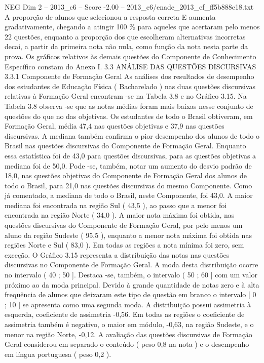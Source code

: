 \begin{textsample}{NEG Dim 2 – 2013\_c6 – Score -2.00 – 2013\_c6/enade\_2013\_ef\_ff5b888e18.txt}
A proporção de alunos que selecionou a resposta correta E aumenta gradativamente, chegando a atingir 100 \% para aqueles que acertaram pelo menos 22 questões, enquanto a proporção dos que escolheram alternativas incorretas decai, a partir da primeira nota não nula, como função da nota nesta parte da prova.
Os gráficos relativos às demais questões do Componente de Conhecimento Específico constam do Anexo I. 3.3 ANÁLISE DAS QUESTÕES DISCURSIVAS 3.3.1 Componente de Formação Geral As análises dos resultados de desempenho dos estudantes de Educação Física ( Bacharelado ) nas duas questões discursivas relativas à Formação Geral encontram -se na Tabela 3.8 e no Gráfico 3.15.
Na Tabela 3.8 observa -se que as notas médias foram mais baixas nesse conjunto de questões do que no das objetivas.
Os estudantes de todo o Brasil obtiveram, em Formação Geral, média 47,4 nas questões objetivas e 37,9 nas questões discursivas.
A mediana também confirma o pior desempenho dos alunos de todo o Brasil nas questões discursivas do Componente de Formação Geral.
Enquanto essa estatística foi de 43,0 para questões discursivas, para as questões objetivas a mediana foi de 50,0.
Pode -se, também, notar um aumento do desvio padrão de 18,0, nas questões objetivas do Componente de Formação Geral dos alunos de todo o Brasil, para 21,0 nas questões discursivas do mesmo Componente.
Como já comentado, a mediana de todo o Brasil, neste Componente, foi 43,0.
A maior mediana foi encontrada na região Sul ( 43,5 ), ao passo que a menor foi encontrada na região Norte ( 34,0 ).
A maior nota máxima foi obtida, nas questões discursivas do Componente de Formação Geral, por pelo menos um aluno da região Sudeste ( 95,5 ), enquanto a menor nota máxima foi obtida nas regiões Norte e Sul ( 83,0 ).
Em todas as regiões a nota mínima foi zero, sem exceção.
O Gráfico 3.15 representa a distribuição das notas nas questões discursivas no Componente de Formação Geral.
A moda desta distribuição ocorre no intervalo ( 40 ; 50 ].
Destaca -se, também, o intervalo ( 50 ; 60 ] com um valor próximo ao da moda principal.
Devido à grande quantidade de notas zero e à alta frequência de alunos que deixaram este tipo de questão em branco o intervalo [ 0 ; 10 ] se apresenta como uma segunda moda.
A distribuição possui assimetria à esquerda, coeficiente de assimetria -0,56.
Em todas as regiões o coeficiente de assimetria também é negativo, o maior em módulo, -0,63, na região Sudeste, e o menor na região Norte, -0,12.
A avaliação das questões discursivas de Formação Geral considerou em separado o conteúdo ( peso 0,8 na nota ) e o desempenho em língua portuguesa ( peso 0,2 ).

\end{textsample}
